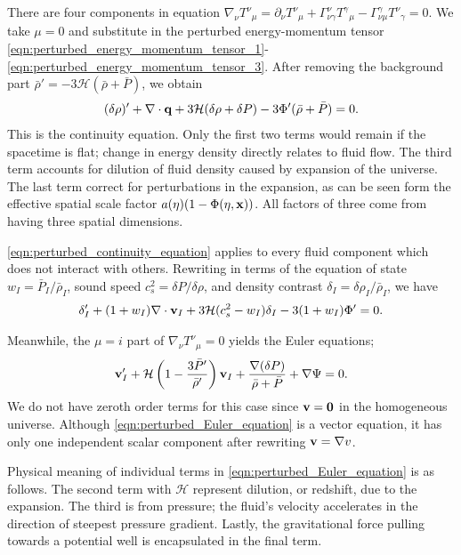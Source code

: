 There are four components in equation $\nabla_\nu {T^\nu}_\mu = \partial_\nu {T^\nu}_\mu + \Gamma^\nu_{\nu\gamma} {T^\gamma}_\mu - \Gamma^\gamma_{\nu\mu} {T^\nu}_\gamma=0$. We take $\mu=0$ and substitute in the perturbed energy-momentum tensor \eqref{eqn:perturbed_energy_momentum_tensor_1}-\eqref{eqn:perturbed_energy_momentum_tensor_3}. After removing the background part $\bar{\rho}'=-3\mathcal{H}(\bar{\rho}+\bar{P})$, we obtain
\begin{align}
	(\delta\rho)' + \nabla \cdot \mathbf{q}+ 3 \mathcal{H} (\delta\rho + \delta P) - 3 \Phi' (\bar{\rho} + \bar{P})  = 0.  \label{eqn:perturbed_continuity_equation}
\end{align}
This is the continuity equation. Only the first two terms would remain if the spacetime is flat; change in energy density directly relates to fluid flow. The third term accounts for dilution of fluid density caused by expansion of the universe. The last term correct for perturbations in the expansion, as can be seen form the effective spatial scale factor $a(\eta)(1-\Phi(\eta,\mathbf{x}))$. All factors of three come from having three spatial dimensions.

\eqref{eqn:perturbed_continuity_equation} applies to every fluid component which does not interact with others. Rewriting in terms of the equation of state $w_I = \bar{P}_I / \bar{\rho}_I$, sound speed $c_s^2 = \delta P / \delta\rho$, and density contrast $\delta_I = \delta\rho_I / \bar{\rho}_I$, we have
\begin{align}
	\delta'_I + (1+w_I) \nabla\cdot\mathbf{v}_I + 3\mathcal{H}(c_s^2-w_I)\delta_I - 3(1+w_I) \Phi' = 0.
\end{align}

Meanwhile, the $\mu=i$ part of $\nabla_\nu {T^\nu}_\mu =0$ yields the Euler equations;
\begin{align}
	\mathbf{v}'_I + \mathcal{H} \left( 1 - \frac{3\bar{P}'}{\bar{\rho}'} \right) \mathbf{v}_I + \frac{\nabla(\delta P)}{\bar{\rho} + \bar{P}} + \nabla\Psi = 0. \label{eqn:perturbed_Euler_equation}
\end{align}
We do not have zeroth order terms for this case since $\mathbf{v}=\mathbf{0}$ in the homogeneous universe. Although \eqref{eqn:perturbed_Euler_equation} is a vector equation, it has only one independent scalar component after rewriting $\mathbf{v}=\nabla v$.

Physical meaning of individual terms in \eqref{eqn:perturbed_Euler_equation} is as follows. The second term with $\mathcal{H}$ represent dilution, or redshift, due to the expansion. The third is from pressure; the fluid's velocity accelerates in the direction of steepest pressure gradient. Lastly, the gravitational force pulling towards a potential well is encapsulated in the final term.

